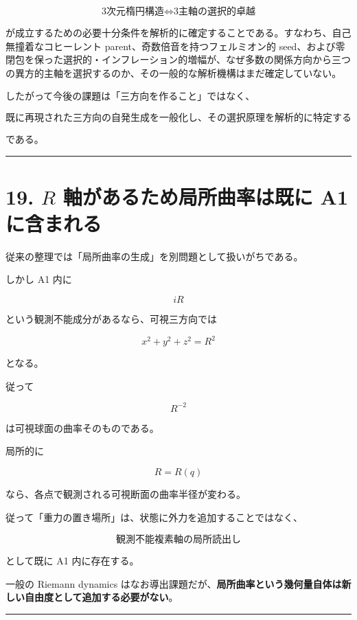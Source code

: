 \documentclass[
  a4paper,
]{ltjsarticle}
\begin{document}
\[
\boxed{
\text{3次元楕円構造}
\Longleftrightarrow
\text{3主軸の選択的卓越}
}
\]

が成立するための必要十分条件を解析的に確定することである。すなわち、自己無撞着なコヒーレント
parent、奇数倍音を持つフェルミオン的
seed、および零閉包を保った選択的・インフレーション的増幅が、なぜ多数の関係方向から三つの異方的主軸を選択するのか、その一般的な解析機構はまだ確定していない。

したがって今後の課題は「三方向を作ること」ではなく、

\[
\boxed{
\text{既に再現された三方向の自発生成を一般化し、その選択原理を解析的に特定すること}
}
\]

である。

\begin{center}\rule{0.5\linewidth}{0.5pt}\end{center}

\section{\texorpdfstring{19. \(R\) 軸があるため局所曲率は既に A1
に含まれる}{19. R 軸があるため局所曲率は既に A1 に含まれる}}\label{r-ux8ef8ux304cux3042ux308bux305fux3081ux5c40ux6240ux66f2ux7387ux306fux65e2ux306b-a1-ux306bux542bux307eux308cux308b}

従来の整理では「局所曲率の生成」を別問題として扱いがちである。

しかし A1 内に

\[
iR
\]

という観測不能成分があるなら、可視三方向では

\[
x^2+y^2+z^2=R^2
\]

となる。

従って

\[
\boxed{
R^{-2}
}
\]

は可視球面の曲率そのものである。

局所的に

\[
R=R(q)
\]

なら、各点で観測される可視断面の曲率半径が変わる。

従って「重力の置き場所」は、状態に外力を追加することではなく、

\[
\boxed{
\text{観測不能複素軸の局所読出し}
}
\]

として既に A1 内に存在する。

一般の Riemann dynamics
はなお導出課題だが、\textbf{局所曲率という幾何量自体は新しい自由度として追加する必要がない}。

\begin{center}\rule{0.5\linewidth}{0.5pt}\end{center}
\end{document}
